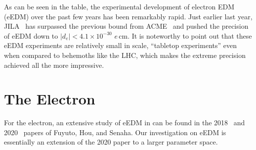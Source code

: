 As can be seen in the table, the experimental development of electron EDM (eEDM) over the past few years has been remarkably rapid.
Just earlier last year, JILA~\cite{JILA2023eEDM} has surpassed the previous bound from ACME~\cite{ACME2018eEDM} and pushed the precision of eEDM down to \(|d_{e}| < 4.1 \times 10^{-30}\) \(e\,\mathrm{cm} \).
It is noteworthy to point out that these eEDM experiments are relatively small in scale, ``tabletop experiments'' even when compared to behemoths like the LHC, which makes the extreme precision achieved all the more impressive.

\section{The Electron}
For the electron, an extensive study of eEDM in {\gthdm} can be found in the 2018~\cite{FHS2018EWBGandEDM} and 2020~\cite{FHS2020EDMCancellation} papers of Fuyuto, Hou, and Senaha.
Our investigation on eEDM is essentially an extension of the 2020 paper to a larger parameter space.

